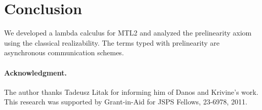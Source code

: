 \documentclass[envcountsame]{llncs}
\begin{document}



\section{Conclusion}
\label{sec:conclude}
We developed a lambda calculus for MTL2 and
analyzed the prelinearity axiom using
the classical realizability.  The terms typed with prelinearity are
asynchronous communication schemes.

\paragraph{Acknowledgment.}
The author thanks Tadeusz Litak for informing him of Danos and
Krivine's work.
This research was supported by
Grant-in-Aid for JSPS Fellows, 23-6978, 2011.




\end{document}
